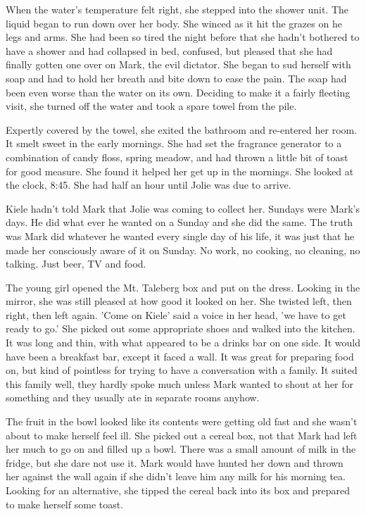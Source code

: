 When the water's temperature felt right, she stepped into the shower unit.  The liquid began to run down over her body.  She winced as it hit the grazes on he legs and arms.  She had been so tired the night before that she hadn't bothered to have a shower and had collapsed in bed, confused, but pleased that she had finally gotten one over on Mark, the evil dictator.  She began to sud herself with soap and had to hold her breath and bite down to ease the pain.  The soap had been even worse than the water on its own.  Deciding to make it a fairly fleeting visit, she turned off the water and took a spare towel from the pile.  

Expertly covered by the towel, she exited the bathroom and re-entered her room.  It smelt sweet in the early mornings.  She had set the fragrance generator to a combination of candy floss, spring meadow, and had thrown a little bit of toast for good measure.  She found it helped her get up in the mornings.  She looked at the clock, 8:45.  She had half an hour until Jolie was due to arrive.  

Kiele hadn't told Mark that Jolie was coming to collect her.  Sundays were Mark's days.  He did what ever he wanted on a Sunday and she did the same.  The truth was Mark did whatever he wanted every single day of his life, it was just that he made her consciously aware of it on Sunday.  No work, no cooking, no cleaning, no talking.  Just beer, TV and food.

The young girl opened the Mt. Taleberg box and put on the dress.  Looking in the mirror, she was still pleased at how good it looked on her.  She twisted left, then right, then left again.  'Come on Kiele' said a voice in her head, 'we have to get ready to go.'  She picked out some appropriate shoes and walked into the kitchen.  It was long and thin, with what appeared to be a drinks bar on one side.  It would have been a breakfast bar, except it faced a wall.  It was great for preparing food on, but kind of pointless for trying to have a conversation with a family.  It suited this family well, they hardly spoke much unless Mark wanted to shout at her for something and they usually ate in separate rooms anyhow.  

The fruit in the bowl looked like its contents were getting old fast and she wasn't about to make herself feel ill.  She picked out a cereal box, not that Mark had left her much to go on and filled up a bowl.  There was a small amount of milk in the fridge, but she dare not use it.  Mark would have hunted her down and thrown her against the wall again if she didn't leave him any milk for his morning tea.  Looking for an alternative, she tipped the cereal back into its box and prepared to make herself some toast.

